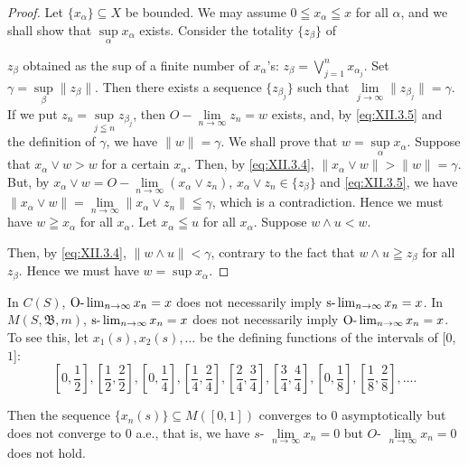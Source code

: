 \begin{proof}
 Let $\{x_{\alpha}\} \subseteq X$ be bounded. We may assume $0 \leqq x_{\alpha} \leqq x$ for all $\alpha$, and we shall show that $\sup\limits_{\alpha} x_{\alpha}$ exists. Consider the totality $\{z_{\beta}\}$ of 

$z_{\beta}$ obtained as the sup of a finite number of $x_{\alpha}$'s: $z_{\beta} = \bigvee\limits_{j=1}^{n} x_{\alpha_j}$. Set $\gamma = \sup\limits_{\beta} \|z_{\beta}\|$. Then there exists a sequence $\{z_{\beta_j}\}$ such that $\lim\limits_{j \to \infty} \|z_{\beta_j}\| = \gamma$. If we put $z_n = \sup\limits_{j \leqq n} z_{\beta_j}$, then $O - \lim\limits_{n \to \infty} z_n = w$ exists, and, by \eqref{eq:XII.3.5} and the definition of $\gamma$, we have $\|w\| = \gamma$. We shall prove that $w = \sup\limits_{\alpha} x_{\alpha}$. Suppose that $x_{\alpha} \vee w > w$ for a certain $x_{\alpha}$. Then, by \eqref{eq:XII.3.4}, $\|x_{\alpha} \vee w\| > \|w\| = \gamma$. But, by $x_{\alpha} \vee w = O - \lim\limits_{n \to \infty} (x_{\alpha} \vee z_n)$, $x_{\alpha} \vee z_n \in \{z_{\beta}\}$ and \eqref{eq:XII.3.5}, we have $\|x_{\alpha} \vee w\| = \lim\limits_{n \to \infty} \|x_{\alpha} \vee z_n\| \leqq \gamma$, which is a contradiction. Hence we must have $w \geqq x_{\alpha}$ for all $x_{\alpha}$. Let $x_{\alpha} \leqq u$ for all $x_{\alpha}$. Suppose $w \wedge u < w$.


Then, by \eqref{eq:XII.3.4}, $\|w \wedge u\| < \gamma$, contrary to the fact that $w \wedge u \geqq z_{\beta}$ for all $z_{\beta}$. Hence we must have $w = \sup x_{\alpha}$. 
\end{proof}

\begin{remarku} In $C(S)$, $\text{O-}\lim_{n \to \infty} x_n = x$ does not necessarily imply $\text{s-}\lim\nolimits_{n \to \infty} x_n = x$. In $M(S, \mathfrak{B}, m)$, $\text{s-}\lim\nolimits_{n \to \infty} x_n = x$ does not necessarily imply $\text{O-}\lim_{n \to \infty} x_n = x$. To see this, let $x_1(s), x_2(s), \ldots$ be the defining functions of the intervals of [$0$, $1$]: 
\[
\left[ 0, \frac {1}{2} \right], \left[ \frac {1}{2}, \frac {2}{2} \right], \left[ 0, \frac {1}{4} \right], \left[ \frac {1}{4}, \frac {2}{4} \right], \left[ \frac {2}{4}, \frac {3}{4} \right], \left[ \frac {3}{4}, \frac {4}{4} \right], \left[ 0, \frac {1}{8} \right], \left[ \frac {1}{8}, \frac {2}{8} \right], \dots .
\]
\end{remarku}

Then the sequence $\{x_{n}(s)\} \subseteq M([0,1])$ converges to $0$ asymptotically but does not converge to $0$ a.e., that is, we have $s\text{- }\lim\limits_{n\to \infty}x_n = 0$ but $O\text{- }\lim\limits_{n\to \infty}x_n = 0$ does not hold. 

